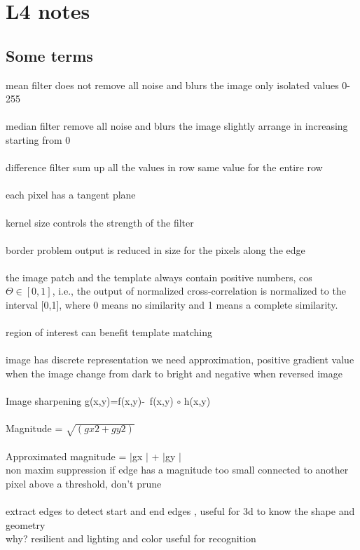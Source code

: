 \documentclass[11pt]{article}
\begin{document}

\section*{L4 notes}
\subsection*{Some terms}
mean filter does not remove all noise and blurs the image
only isolated values 0-255
\\\\
median filter remove all noise and blurs the image slightly
arrange in increasing starting from 0
\\\\
difference filter sum up all the values in row 
same value for the entire row
\\\\
each pixel has a tangent plane
\\\\
kernel size controls the strength of the filter
\\\\
border problem output is reduced in size for the pixels along the edge
\\\\
 the image patch and the template always contain positive numbers, cos $\Theta \in [0, 1]$, i.e., the output of normalized cross-correlation is normalized to the interval [0,1], where 0 means no similarity and 1 means a complete similarity. 
\\\\
region of interest can benefit template matching
\\\\
image has discrete representation we need approximation, positive gradient value when the image change from dark to bright and negative when reversed image
\\\\
Image sharpening g(x,y)=f(x,y)- f(x,y) $\circ $ h(x,y)
\\\\
Magnitude = $\sqrt{(gx2 + gy2 )}$\\\\
Approximated magnitude = $|$gx $|$ + $|$gy $|
$
\\
non maxim suppression
if edge has a magnitude too small connected to another pixel above a threshold, don’t prune 
\\\\
extract edges to detect start and end edges , useful for 3d to know the shape and geometry\\
why? resilient and lighting and color useful for recognition
\\
\\
\end{document}
